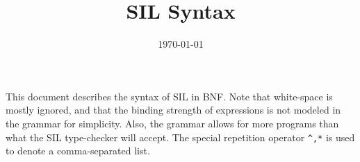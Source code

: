 \documentclass[]{article}
\title{SIL Syntax}
\date{\today}
\begin{document}
\maketitle


This document describes the syntax of SIL in BNF.  Note that white-space is
mostly ignored, and that the binding strength of expressions is not modeled
in the grammar for simplicity.  Also, the grammar allows for more programs
than what the SIL type-checker will accept.
The special repetition operator \lstinline[language=bnf]{^,*} is used to
denote a comma-separated list.


\lstset{language=bnf}

\end{document}
